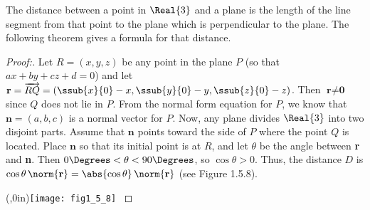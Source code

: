 The distance between a point in $\Real{3}$ and a plane is the length of the line segment from that point to the plane
which is perpendicular to the plane. The following theorem gives a formula for that distance.
\begin{proofbar}\vspace{-3mm}\begin{proof}[Proof:]
 \par\noindent Let $R = (x,y,z)$ be any point in the plane $P$ (so that $ax + by + cz + d = 0$)
 and let $\textbf{r} = \overrightarrow{RQ} =
 (\ssub{x}{0} - x,\ssub{y}{0} - y,\ssub{z}{0} - z)$. Then $\textbf{r} \ne \textbf{0}$ since $Q$ does not lie in $P$.
 From the normal form equation for $P$, we know that $\textbf{n} = (a,b,c)$ is a normal vector for $P$. Now, any plane
 divides $\Real{3}$ into two disjoint parts. Assume that $\textbf{n}$ points toward the side of $P$ where the point
 $Q$ is located. Place $\textbf{n}$ so that its initial point is at $R$, and let $\theta$ be the angle between
 \textbf{r} and \textbf{n}. Then $0\Degrees < \theta < 90\Degrees$, so $\cos \theta > 0$. Thus, the distance $D$ is
 $\cos \theta \,\norm{\textbf{r}} = \abs{\cos \theta}\,\norm{\textbf{r}}$ (see Figure 1.5.8).

 \piccaption[]{}\parpic(\textwidth,0in){\texttt{[image: fig1\_5\_8]}
 \piccaptioninside}
 \par\mbox{}\newline\vspace{1mm}


\end{proof}
\end{proofbar}
